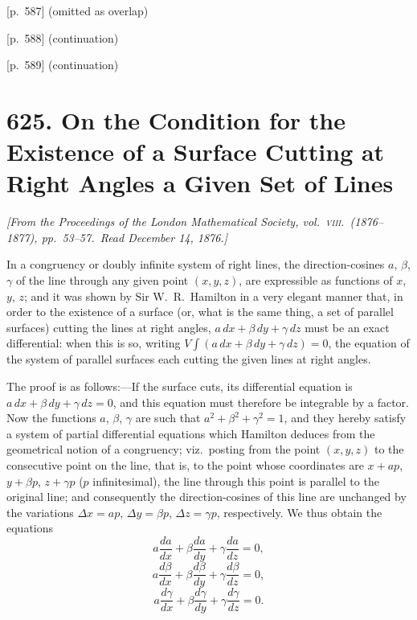 \documentclass[11pt,a4paper]{article}
\theoremstyle{plain}
\theoremstyle{definition}
\theoremstyle{remark}
\begin{document}
\bigskip

[p.~587] (omitted as overlap)

\bigskip

[p.~588] (continuation)

\bigskip

[p.~589] (continuation)

\bigskip

\newpage
\section*{\textbf{625.} On the Condition for the Existence of a Surface Cutting at Right Angles a Given Set of Lines}

\textit{[From the Proceedings of the London Mathematical Society, vol.\ \textsc{viii}.\ (1876--1877), pp.~53--57.\ Read December 14, 1876.]}

\bigskip

In a congruency or doubly infinite system of right lines, the direction-cosines $a$, $\beta$, $\gamma$ of the line through any given point $(x, y, z)$, are expressible as functions of $x$, $y$, $z$; and it was shown by Sir W.\ R.\ Hamilton in a very elegant manner that, in order to the existence of a surface (or, what is the same thing, a set of parallel surfaces) cutting the lines at right angles, $a\, dx + \beta\, dy + \gamma\, dz$ must be an exact differential: when this is so, writing $V \int (a\, dx + \beta\, dy + \gamma\, dz) = 0$, the equation of the system of parallel surfaces each cutting the given lines at right angles.

The proof is as follows:---If the surface cuts, its differential equation is $a\, dx + \beta\, dy + \gamma\, dz = 0$, and this equation must therefore be integrable by a factor. Now the functions $a$, $\beta$, $\gamma$ are such that $a^2 + \beta^2 + \gamma^2 = 1$, and they hereby satisfy a system of partial differential equations which Hamilton deduces from the geometrical notion of a congruency; viz.\ posting from the point $(x, y, z)$ to the consecutive point on the line, that is, to the point whose coordinates are $x + a p$, $y + \beta p$, $z + \gamma p$ ($p$ infinitesimal), the line through this point is parallel to the original line; and consequently the direction-cosines of this line are unchanged by the variations $\Delta x = a p$, $\Delta y = \beta p$, $\Delta z = \gamma p$, respectively. We thus obtain the equations
\[
a \frac{da}{dx} + \beta \frac{da}{dy} + \gamma \frac{da}{dz} = 0,
\]
\[
a \frac{d\beta}{dx} + \beta \frac{d\beta}{dy} + \gamma \frac{d\beta}{dz} = 0,
\]
\[
a \frac{d\gamma}{dx} + \beta \frac{d\gamma}{dy} + \gamma \frac{d\gamma}{dz} = 0.
\]
\end{document}
